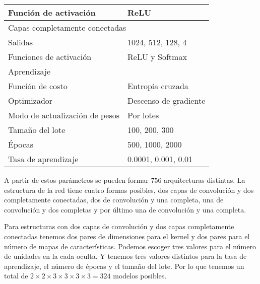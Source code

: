 \begin{table}[htbp]
\begin{tabular}{|l|l|}
Función de activación    & ReLU                                                                                                                                        \\ \hline
\multicolumn{2}{|l|}{Capas completamente conectadas}                                                                                                                   \\ \hline
Salidas                  & 1024, 512, 128, 4                                                                                                                               \\ \hline
Funciones de activación  & ReLU y Softmax                                                                                                                              \\ \hline
\multicolumn{2}{|l|}{Aprendizaje}                                                                                                                                      \\ \hline
Función de costo         & Entropía cruzada                                                                                                                            \\ \hline
Optimizador              & Descenso de gradiente                                                                                                                       \\ \hline
Modo de actualización de pesos & Por lotes
\\ \hline
Tamaño del lote & 100, 200, 300
\\ \hline
Épocas & 500, 1000, 2000
\\ \hline
Tasa de aprendizaje & 0.0001, 0.001, 0.01
\\ \hline
\end{tabular}

\end{table}

A partir de estos parámetros se pueden formar $756$ arquitecturas distintas. 
La estructura de la red tiene cuatro formas posibles, dos capas de convolución
y dos completamente conectadas, dos de convolución y una completa, una de convolución
y dos completas y por último una de convolución y una completa. 

Para estructuras con dos capas de convolución y dos capas completamente conectadas 
tenemos dos
pares de dimensiones para el kernel y dos pares para el número de mapas de 
características. Podemos escoger tres valores para el número de unidades 
en la cada oculta. Y tenemos tres valores distintos para la tasa de aprendizaje, 
el número de épocas y el tamaño del lote. Por lo que tenemos un total
de $2 \times 2 \times 3 \times 3 \times 3 \times 3 = 324$ modelos posibles. 

